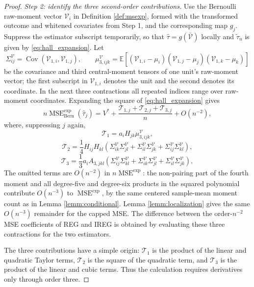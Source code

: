 \documentclass{article}
\newcommand{\EEE}{\mathbb{E}}
\newcommand{\p}[1]{\left(#1\right)}
\newcommand{\htau}{\hat{\tau}}
\DeclareMathOperator{\MSE}{MSE}
\DeclareMathOperator{\Cov}{Cov}
\newcommand{\Bern}{\mathrm{Bern}}
\newcommand{\MSEexp}{\MSE^{\mathrm{exp}}}
\theoremstyle{plain}
\theoremstyle{definition}
\theoremstyle{remark}
\begin{document}
\begin{proof}
\emph{Step 2: identify the three second-order contributions.}
Use the Bernoulli raw-moment vector $\mathcal V_i$ in
Definition \ref{def:msexp}, formed with the transformed outcome
and whitened covariates from Step 1, and the corresponding map
$g_j$. Suppress the estimator subscript temporarily, so that
$\htau=g(\bar{\mathcal V})$ locally and
$\tilde\tau_n$ is given by \eqref{eq:hall_expansion}. Let
\[
\Sigma^{\mathcal V}_{ij}
=
\Cov(\mathcal V_{1,i},\mathcal V_{1,j}),
\qquad
\mu^{\mathcal V}_{3,ijk}
=
\EEE[
(\mathcal V_{1,i}-\mu_i)
(\mathcal V_{1,j}-\mu_j)
(\mathcal V_{1,k}-\mu_k)
]
\]
be the covariance and third central-moment tensors of one unit's
raw-moment vector; the first subscript in $\mathcal V_{1,i}$ denotes
the unit and the second denotes its coordinate. In the next three
contractions all repeated indices range over raw-moment coordinates.
Expanding the square of \eqref{eq:hall_expansion} gives
\[
n\MSEexp_\Bern(\htau_j)
=V^*+\frac{\mathcal T_{1,j}+\mathcal T_{2,j}+\mathcal T_{3,j}}{n}
+O(n^{-2}),
\]
where, suppressing $j$ again,
\begin{equation}
\label{eq:hall_T1}
\mathcal T_1
=
a_iH_{jk}\mu^{\mathcal V}_{3,ijk},
\end{equation}
\begin{equation}
\label{eq:hall_T2_bern}
\mathcal T_2
=
\frac14 H_{ij}H_{kl}
\p{
\Sigma^{\mathcal V}_{ik}\Sigma^{\mathcal V}_{jl}
+
\Sigma^{\mathcal V}_{il}\Sigma^{\mathcal V}_{jk}
+
\Sigma^{\mathcal V}_{ij}\Sigma^{\mathcal V}_{kl}
},
\end{equation}
\begin{equation}
\label{eq:hall_T3_bern}
\mathcal T_3
=
\frac13 a_iA_{3,jkl}\p{
\Sigma^{\mathcal V}_{ij}\Sigma^{\mathcal V}_{kl}
+
\Sigma^{\mathcal V}_{ik}\Sigma^{\mathcal V}_{jl}
+
\Sigma^{\mathcal V}_{il}\Sigma^{\mathcal V}_{jk}
},
\end{equation}
The omitted terms are $O(n^{-2})$ in $n\MSEexp$:
the non-pairing part of the fourth moment and all degree-five and
degree-six products in the squared polynomial contribute $O(n^{-3})$
to $\MSEexp$, by the same centered sample-mean moment count as in
Lemma \ref{lemm:conditional}. Lemma \ref{lemm:localization} gives the same $O(n^{-3})$ remainder for the capped MSE. The difference between the order-$n^{-2}$ MSE
coefficients of REG and IREG is obtained by evaluating these three
contractions for the two estimators.

The three contributions have a simple origin: $\mathcal T_1$ is the
product of the linear and quadratic Taylor terms, $\mathcal T_2$ is
the square of the quadratic term, and $\mathcal T_3$ is the product of
the linear and cubic terms. Thus the calculation requires derivatives
only through order three.


\end{proof}
\end{document}
